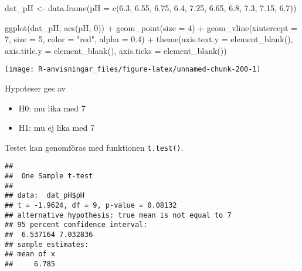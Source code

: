 \documentclass[
]{book}
\newenvironment{Shaded}{\begin{snugshade}}{\end{snugshade}}
\newcommand{\AttributeTok}[1]{\textcolor[rgb]{0.77,0.63,0.00}{#1}}
\newcommand{\DecValTok}[1]{\textcolor[rgb]{0.00,0.00,0.81}{#1}}
\newcommand{\FloatTok}[1]{\textcolor[rgb]{0.00,0.00,0.81}{#1}}
\newcommand{\FunctionTok}[1]{\textcolor[rgb]{0.00,0.00,0.00}{#1}}
\newcommand{\NormalTok}[1]{#1}
\newcommand{\OtherTok}[1]{\textcolor[rgb]{0.56,0.35,0.01}{#1}}
\newcommand{\SpecialCharTok}[1]{\textcolor[rgb]{0.00,0.00,0.00}{#1}}
\newcommand{\StringTok}[1]{\textcolor[rgb]{0.31,0.60,0.02}{#1}}
\providecommand{\tightlist}{%
  \setlength{\itemsep}{0pt}\setlength{\parskip}{0pt}}
\theoremstyle{definition}
\theoremstyle{definition}
\theoremstyle{definition}
\theoremstyle{definition}
\theoremstyle{remark}
\begin{document}
\begin{Shaded}
\begin{Highlighting}[]
\NormalTok{dat\_pH }\OtherTok{\textless{}{-}} \FunctionTok{data.frame}\NormalTok{(}\AttributeTok{pH =} \FunctionTok{c}\NormalTok{(}\FloatTok{6.3}\NormalTok{, }\FloatTok{6.55}\NormalTok{, }\FloatTok{6.75}\NormalTok{, }\FloatTok{6.4}\NormalTok{, }\FloatTok{7.25}\NormalTok{, }\FloatTok{6.65}\NormalTok{, }\FloatTok{6.8}\NormalTok{, }\FloatTok{7.3}\NormalTok{, }\FloatTok{7.15}\NormalTok{, }\FloatTok{6.7}\NormalTok{))}

\FunctionTok{ggplot}\NormalTok{(dat\_pH, }\FunctionTok{aes}\NormalTok{(pH, }\DecValTok{0}\NormalTok{)) }\SpecialCharTok{+}
  \FunctionTok{geom\_point}\NormalTok{(}\AttributeTok{size =} \DecValTok{4}\NormalTok{) }\SpecialCharTok{+}
  \FunctionTok{geom\_vline}\NormalTok{(}\AttributeTok{xintercept =} \DecValTok{7}\NormalTok{, }\AttributeTok{size =} \DecValTok{5}\NormalTok{, }\AttributeTok{color =} \StringTok{"red"}\NormalTok{, }\AttributeTok{alpha =} \FloatTok{0.4}\NormalTok{) }\SpecialCharTok{+}
  \FunctionTok{theme}\NormalTok{(}\AttributeTok{axis.text.y =} \FunctionTok{element\_blank}\NormalTok{(), }
        \AttributeTok{axis.title.y =} \FunctionTok{element\_blank}\NormalTok{(), }
        \AttributeTok{axis.ticks =} \FunctionTok{element\_blank}\NormalTok{())}
\end{Highlighting}
\end{Shaded}

\begin{center}\texttt{[image: R-anvisningar\_files/figure-latex/unnamed-chunk-200-1]} \end{center}

Hypoteser ges av

\begin{itemize}
\tightlist
\item
  H0: mu lika med 7
\item
  H1: mu ej lika med 7
\end{itemize}

Testet kan genomföras med funktionen \texttt{t.test()}.

\begin{Shaded}
\end{Shaded}

\begin{verbatim}
## 
##  One Sample t-test
## 
## data:  dat_pH$pH
## t = -1.9624, df = 9, p-value = 0.08132
## alternative hypothesis: true mean is not equal to 7
## 95 percent confidence interval:
##  6.537164 7.032836
## sample estimates:
## mean of x 
##     6.785
\end{verbatim}
\end{document}
